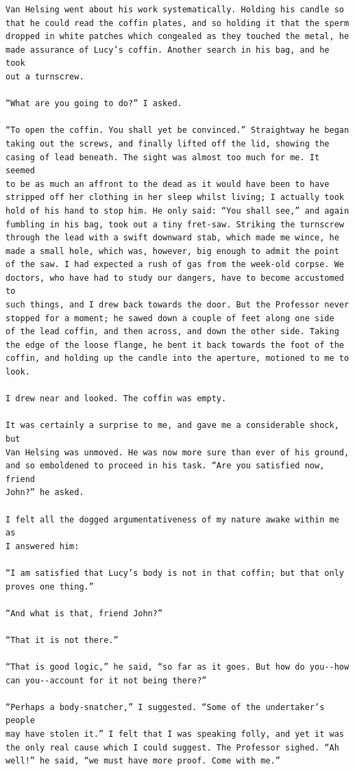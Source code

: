 \documentclass{article}
\begin{document}
\begin{verbatim}
Van Helsing went about his work systematically. Holding his candle so
that he could read the coffin plates, and so holding it that the sperm
dropped in white patches which congealed as they touched the metal, he
made assurance of Lucy’s coffin. Another search in his bag, and he took
out a turnscrew.

“What are you going to do?” I asked.

“To open the coffin. You shall yet be convinced.” Straightway he began
taking out the screws, and finally lifted off the lid, showing the
casing of lead beneath. The sight was almost too much for me. It seemed
to be as much an affront to the dead as it would have been to have
stripped off her clothing in her sleep whilst living; I actually took
hold of his hand to stop him. He only said: “You shall see,” and again
fumbling in his bag, took out a tiny fret-saw. Striking the turnscrew
through the lead with a swift downward stab, which made me wince, he
made a small hole, which was, however, big enough to admit the point
of the saw. I had expected a rush of gas from the week-old corpse. We
doctors, who have had to study our dangers, have to become accustomed to
such things, and I drew back towards the door. But the Professor never
stopped for a moment; he sawed down a couple of feet along one side
of the lead coffin, and then across, and down the other side. Taking
the edge of the loose flange, he bent it back towards the foot of the
coffin, and holding up the candle into the aperture, motioned to me to
look.

I drew near and looked. The coffin was empty.

It was certainly a surprise to me, and gave me a considerable shock, but
Van Helsing was unmoved. He was now more sure than ever of his ground,
and so emboldened to proceed in his task. “Are you satisfied now, friend
John?” he asked.

I felt all the dogged argumentativeness of my nature awake within me as
I answered him:

“I am satisfied that Lucy’s body is not in that coffin; but that only
proves one thing.”

“And what is that, friend John?”

“That it is not there.”

“That is good logic,” he said, “so far as it goes. But how do you--how
can you--account for it not being there?”

“Perhaps a body-snatcher,” I suggested. “Some of the undertaker’s people
may have stolen it.” I felt that I was speaking folly, and yet it was
the only real cause which I could suggest. The Professor sighed. “Ah
well!” he said, “we must have more proof. Come with me.”


\end{verbatim}
\end{document}
